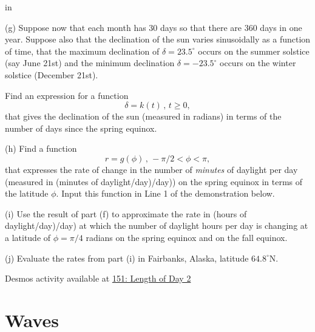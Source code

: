\documentclass{ximera}
\newcommand{\pskip}{\vskip 0.1 in}
\begin{document}
\begin{question}
\pskip 

(g) Suppose now that each month has 30 days so that there are 360 days in one year. Suppose also that the declination of the sun varies sinusoidally as a function of time, that the maximum declination of $\delta = 23.5^\circ$ occurs on the summer solstice (say June 21st) and the minimum declination $\delta = -23.5^\circ$ occurs on the winter solstice (December 21st). 

Find an expression for a function
\[
     \delta = k(t) \, , \, t\geq 0,
\]
that gives the declination of the sun (measured in radians) in terms of the number of days since the spring equinox. 

(h) Find a function
\[
   r = g(\phi) \, , \, -\pi/2 < \phi < \pi ,
\]
that expresses the rate of change in the number of \emph{minutes} of daylight per day (measured in (minutes of daylight/day)/day)) on the spring equinox in terms of the latitude $\phi$. Input this function in Line 1 of the demonstration below.

(i) Use the result of part (f) to approximate the rate in (hours of daylight/day)/day) at which the number of daylight hours per day is changing at a latitude of $\phi = \pi/4$ radians on the spring equinox and on the fall equinox. 

(j) Evaluate the rates from part (i) in Fairbanks, Alaska, latitude $64.8^\circ$N.

\begin{onlineOnly}
    \begin{center}
\end{center}
\end{onlineOnly}

Desmos activity available at \href{https://www.desmos.com/calculator/nf8n5uphhl}{151: Length of Day 2}



\end{question}


\section*{Waves}
\end{document}
